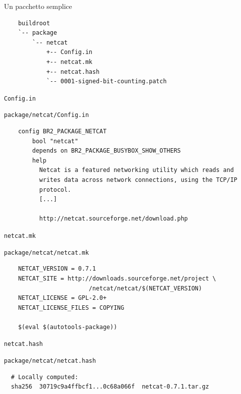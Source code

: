 \documentclass[xetex,table]{beamer}
\begin{document}
\begin{frame}[fragile]{Un pacchetto semplice}
  \begin{verbatim}
    buildroot
    `-- package
        `-- netcat
            +-- Config.in
            +-- netcat.mk
            +-- netcat.hash
            `-- 0001-signed-bit-counting.patch
  \end{verbatim}
\end{frame}

\begin{frame}[fragile]{\tt Config.in}

  {\tt package/netcat/Config.in}
  \begin{verbatim}
    config BR2_PACKAGE_NETCAT
        bool "netcat"
        depends on BR2_PACKAGE_BUSYBOX_SHOW_OTHERS
        help
          Netcat is a featured networking utility which reads and
          writes data across network connections, using the TCP/IP
          protocol.
          [...]

          http://netcat.sourceforge.net/download.php
  \end{verbatim}
\end{frame}

\begin{frame}[fragile]{\tt netcat.mk}

  {\tt package/netcat/netcat.mk}
  \begin{verbatim}
    NETCAT_VERSION = 0.7.1
    NETCAT_SITE = http://downloads.sourceforge.net/project \
                        /netcat/netcat/$(NETCAT_VERSION)
    NETCAT_LICENSE = GPL-2.0+
    NETCAT_LICENSE_FILES = COPYING

    $(eval $(autotools-package))
  \end{verbatim}
\end{frame}

\begin{frame}[fragile]{\tt netcat.hash}

  {\tt package/netcat/netcat.hash}
  \begin{verbatim}
  # Locally computed:
  sha256  30719c9a4ffbcf1...0c68a066f  netcat-0.7.1.tar.gz
  \end{verbatim}
\end{frame}
\end{document}
